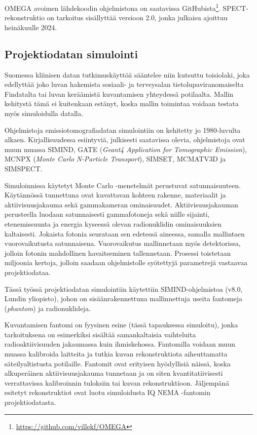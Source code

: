 OMEGA avoimen lähdekoodin ohjelmistona on saatavissa GitHubista\footnote{\url{https://github.com/villekf/OMEGA}}. SPECT-rekonstruktio on tarkoitus sisällyttää versioon 2.0, jonka julkaisu ajoittuu heinäkuulle 2024.

\subsection{Projektiodatan simulointi}
Suomessa kliinisen datan tutkimuskäyttöä sääntelee niin kutsuttu toisiolaki, joka edellyttää joko luvan hakemista sosiaali- ja terveysalan tietolupaviranomaiselta Findatalta tai luvan keräämistä kuvantamisen yhteydessä potilaalta. Mallin kehitystä tämä ei kuitenkaan estänyt, koska mallin toimintaa voidaan testata myös simuloidulla datalla.

Ohjelmistoja emissiotomografiadatan simulointiin on kehitetty jo 1980-luvulta alkaen\cite{ljungberg_monte_1989}. Kirjallisuudessa esiintyviä, julkisesti saatavissa olevia, ohjelmistoja ovat muun muassa SIMIND\cite{ljungberg_monte_1989, taheri_monte_2017, giannone_monte_1999}, GATE (\textit{Geant4 Application for Tomographic Emission})\cite{jan_gate_2004, taheri_monte_2017}, MCNPX (\textit{Monte Carlo N-Particle Transport})\cite{taheri_monte_2017}, SIMSET\cite{giannone_monte_1999}, MCMATV3D\cite{giannone_monte_1999} ja SIMSPECT\cite{giannone_monte_1999}.

Simuloinnissa käytetyt Monte Carlo -menetelmät perustuvat satunnaisuuteen. Käytännössä tunnettuna ovat kuvattavan kohteen rakenne, materiaalit ja aktiivisuusjakauma sekä gammakameran ominaisuudet. Aktiivisuusjakauman perusteella luodaan satunnaisesti gammafotoneja sekä niille sijainti, etenemissuunta ja energia kyseessä olevan radionuklidin ominaisuuksien kaltaisesti. Jokaista fotonia seurataan sen edetessä aineessa, samalla mallintaen vuorovaikutusta satunnaisena. Vuorovaikutus mallinnetaan myös detektorissa, jolloin fotonin mahdollinen havaitseminen tallennetaan. Prosessi toistetaan miljoonia kertoja, jolloin saadaan ohjelmistolle syötettyjä parametrejä vastaavaa projektiodataa.\cite{ljungberg_monte_1989}

Tässä työssä projektiodatan simulointiin käytettiin SIMIND-ohjelmistoa (v8.0, Lundin yliopisto)\cite{ljungberg_monte_1989}, johon on sisäänrakennettuna mallinnettuja useita fantomeja (\textit{phantom}) ja radionuklideja.

Kuvantamisen fantomi on fyysinen esine (tässä tapauksessa simuloitu), jonka tarkoituksena on esimerkiksi sisältää samankaltaisia vaihteluita radioaktiivisuuden jakaumassa kuin ihmiskehossa. Fantomilla voidaan muun muassa kalibroida laitteita ja tutkia kuvan rekonstruktiota aiheuttamatta säteilyaltistusta potilaille. Fantomit ovat erityisen hyödyllisiä näissä, koska alkuperäinen aktiivisuusjakauma tunnetaan ja on siten kvantitatiivisesti verrattavissa kalibroinnin tuloksiin tai kuvan rekonstruktioon. Jäljempänä esitetyt rekonstruktiot ovat luotu simuloidusta IQ NEMA -fantomin projektiodatasta.

